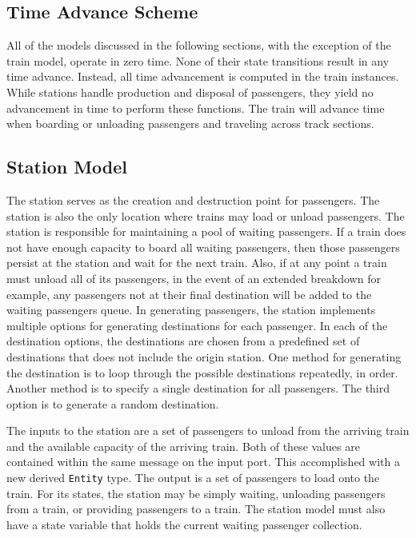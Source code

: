 \subsection{Time Advance Scheme}
All of the models discussed in the following sections, with the exception of the train model, operate in zero time.  None of their state transitions result in any time advance.  Instead, all time advancement is computed in the train instances. While stations handle production and disposal of passengers, they yield no advancement in time to perform these functions.  The train will advance time when boarding or unloading passengers and traveling across track sections.
%
\subsection{Station Model}
The station serves as the creation and destruction point for passengers.  The station is also the only location where trains may load or unload passengers. The station is responsible for maintaining a pool of waiting passengers.  If a train does not have enough capacity to board all waiting passengers, then those passengers persist at the station and wait for the next train.  Also, if at any point a train must unload all of its passengers, in the event of an extended breakdown for example, any passengers not at their final destination will be added to the waiting passengers queue. In generating passengers, the station implements multiple options for generating destinations for each passenger.  In each of the destination options, the destinations are chosen from a predefined set of destinations that does not include the origin station.  One method for generating the destination is to loop through the possible destinations repeatedly, in order.  Another method is to specify a single destination for all passengers.  The third option is to generate a random destination.

The inputs to the station are a set of passengers to unload from the arriving train and the available capacity of the arriving train.  Both of these values are contained within the same message on the input port.  This accomplished with a new derived \texttt{Entity} type.  The output is a set of passengers to load onto the train. For its states, the station may be simply waiting, unloading passengers from a train, or providing passengers to a train.  The station model must also have a state variable that holds the current waiting passenger collection. 

